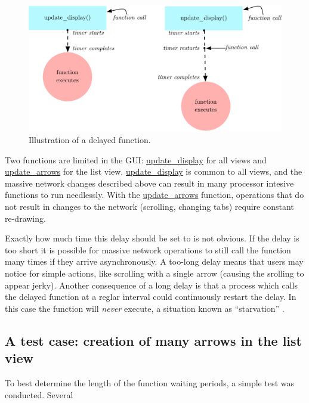 \begin{figure}[ht]
	\centering
		\includegraphics[width=1\textwidth]{figures/waiting_period}
		\caption{Illustration of a delayed function.}
		\label{fig:waiting_period}
\end{figure}

Two functions are limited in the GUI: \url{update_display} for all views and \url{update_arrows} for the list view. \url{update_display} is common to all views, and the massive network changes described above can result in many processor intesive functions to run needlessly. With the \url{update_arrows} function, operations that do not result in changes to the network (scrolling, changing tabs) require constant re-drawing.

Exactly how much time this delay should be set to is not obvious. If the delay is too short it is possible for massive network operations to still call the function many times if they arrive asynchronously. A too-long delay means that users may notice for simple actions, like scrolling with a single arrow (causing the srolling to appear jerky). Another consequence of a long delay is that a process which calls the delayed function at a reglar interval could continuously restart the delay. In this case the function will \emph{never} execute, a situation known as ``starvation'' .
	

	\subsection{A test case: creation of many arrows in the list view} %
	\label{sub:test_case}

To best determine the length of the function waiting periods, a simple test was conducted. Several

